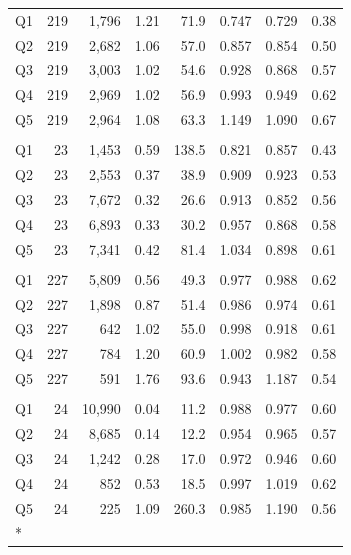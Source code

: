{\begin{longtable}[t]{lrrrrrrr}
\hspace{1em}Q1 & 219 & 1,796 & 1.21 & 71.9 & 0.747 & 0.729 & 0.38\\
\hspace{1em}Q2 & 219 & 2,682 & 1.06 & 57.0 & 0.857 & 0.854 & 0.50\\
\hspace{1em}Q3 & 219 & 3,003 & 1.02 & 54.6 & 0.928 & 0.868 & 0.57\\
\hspace{1em}Q4 & 219 & 2,969 & 1.02 & 56.9 & 0.993 & 0.949 & 0.62\\
\hspace{1em}Q5 & 219 & 2,964 & 1.08 & 63.3 & 1.149 & 1.090 & 0.67\\
\addlinespace[0.3em]
\hline
\multicolumn{8}{l}{Panel D: Momentum --- Passive}\\
\hspace{1em}Q1 & 23 & 1,453 & 0.59 & 138.5 & 0.821 & 0.857 & 0.43\\
\hspace{1em}Q2 & 23 & 2,553 & 0.37 & 38.9 & 0.909 & 0.923 & 0.53\\
\hspace{1em}Q3 & 23 & 7,672 & 0.32 & 26.6 & 0.913 & 0.852 & 0.56\\
\hspace{1em}Q4 & 23 & 6,893 & 0.33 & 30.2 & 0.957 & 0.868 & 0.58\\
\hspace{1em}Q5 & 23 & 7,341 & 0.42 & 81.4 & 1.034 & 0.898 & 0.61\\
\addlinespace[0.3em]
\hline
\multicolumn{8}{l}{Panel E: Fee --- Active}\\
\hspace{1em}Q1 & 227 & 5,809 & 0.56 & 49.3 & 0.977 & 0.988 & 0.62\\
\hspace{1em}Q2 & 227 & 1,898 & 0.87 & 51.4 & 0.986 & 0.974 & 0.61\\
\hspace{1em}Q3 & 227 & 642 & 1.02 & 55.0 & 0.998 & 0.918 & 0.61\\
\hspace{1em}Q4 & 227 & 784 & 1.20 & 60.9 & 1.002 & 0.982 & 0.58\\
\hspace{1em}Q5 & 227 & 591 & 1.76 & 93.6 & 0.943 & 1.187 & 0.54\\
\addlinespace[0.3em]
\hline
\multicolumn{8}{l}{Panel F: Fee --- Passive}\\
\hspace{1em}Q1 & 24 & 10,990 & 0.04 & 11.2 & 0.988 & 0.977 & 0.60\\
\hspace{1em}Q2 & 24 & 8,685 & 0.14 & 12.2 & 0.954 & 0.965 & 0.57\\
\hspace{1em}Q3 & 24 & 1,242 & 0.28 & 17.0 & 0.972 & 0.946 & 0.60\\
\hspace{1em}Q4 & 24 & 852 & 0.53 & 18.5 & 0.997 & 1.019 & 0.62\\
\hspace{1em}Q5 & 24 & 225 & 1.09 & 260.3 & 0.985 & 1.190 & 0.56\\*
\end{longtable}
}

